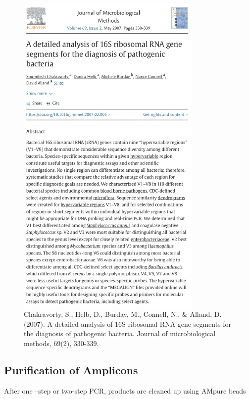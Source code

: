 \documentclass[
]{book}
\begin{document}
\begin{figure}
\centering
\includegraphics[width=0.8\textwidth,height=\textheight]{./Figures/MicrobialMeth.png}
\caption{Chakravorty, S., Helb, D., Burday, M., Connell, N., \& Alland, D. (2007). A detailed analysis of 16S ribosomal RNA gene segments for the diagnosis of pathogenic bacteria. Journal of microbiological methods, 69(2), 330-339.}
\end{figure}

\hypertarget{purification-of-amplicons}{%
\subsection{Purification of Amplicons}\label{purification-of-amplicons}}

After one --step or two-step PCR, products are cleaned up using AMpure beads
\end{document}
